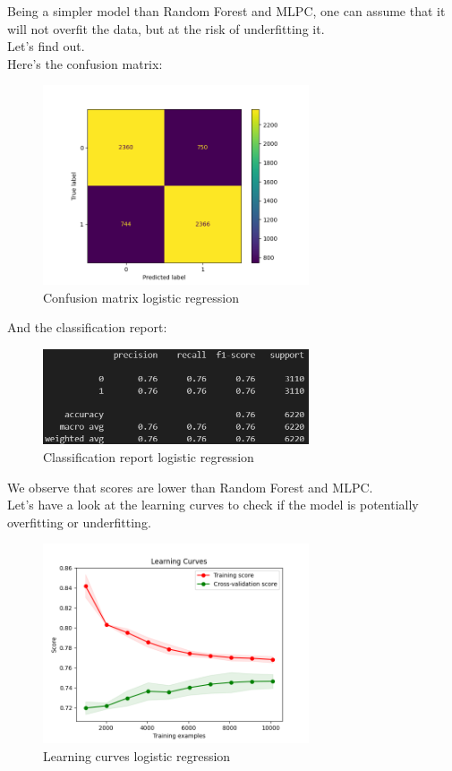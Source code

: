 \documentclass[a4paper,12pt]{article}
\begin{document}
Being a simpler model than Random Forest and MLPC, one can assume that it will not overfit the data, but at the risk of underfitting it.\\

Let's find out.\\

Here's the confusion matrix:
\begin{figure}[H]
  \centering
  \includegraphics[width=0.7\textwidth]{./images/confusion_matrix_logistic.png}
  \caption{Confusion matrix logistic regression}
  \label{fig:cm_logistic}
\end{figure}

And the classification report:
\begin{figure}[H]
  \centering
  \includegraphics[width=0.7\textwidth]{./images/report_logistic.png}
  \caption{Classification report logistic regression}
  \label{fig:report_logistic}
\end{figure}

We observe that scores are lower than Random Forest and MLPC.\\

Let's have a look at the learning curves to check if the model is potentially overfitting or underfitting.
\begin{figure}[H]
  \centering
  \includegraphics[width=0.7\textwidth]{./images/learning_curves_logistic.png}
  \caption{Learning curves logistic regression}
  \label{fig:lc_logistic}
\end{figure}
\end{document}
